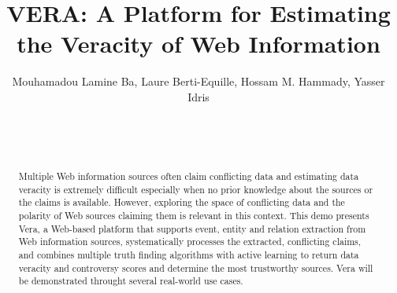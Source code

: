 \documentclass{sig-alternate}
\begin{document}
\conferenceinfo{}{}

\title{VERA: A Platform for Estimating the Veracity of Web Information}

\author{
\alignauthor
Mouhamadou Lamine Ba, Laure Berti-Equille, Hossam M. Hammady, Yasser Idris\\
       \\
       \\
       \\
}


\maketitle

\begin{abstract}
Multiple Web information sources often claim conflicting data and estimating data veracity is extremely difficult especially when no prior knowledge about the sources or the claims is available. However, exploring the space of conflicting data and the polarity of Web sources claiming them is relevant in this context.
This demo presents Vera, a Web-based platform that supports event, entity and relation
extraction from Web information sources, systematically processes the extracted, conflicting claims, and
combines multiple truth finding algorithms with active learning to return data veracity and controversy scores and determine the most trustworthy sources. Vera will be demonstrated throught several real-world use cases.
\end{abstract}

\end{document}
